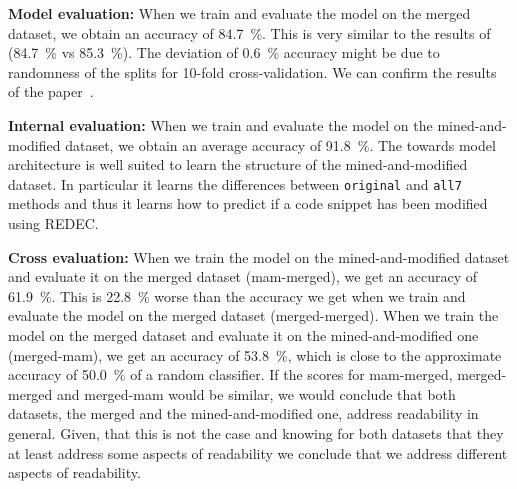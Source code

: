 \documentclass[%
class=scrreprt,
chapterprefix=false,%
open=right,%
twoside=false,%
paper=a4,%
logofile={Logo\_zentral\_farbig\_EN.png},%
thesistype=master,%
UKenglish,%
]{se2thesis}
\theoremstyle{definition}
\newcommand{\rdh}{REDEC\xspace}
\begin{document}
	\textbf{Model evaluation:}
	When we train and evaluate the model on the merged dataset, we obtain an accuracy of 84.7~\%. This is very similar to the results of \citeauthor{mi2022towards} (84.7~\% vs 85.3~\%). The deviation of 0.6~\% accuracy might be due to randomness of the splits for 10-fold cross-validation. We can confirm the results of the paper~\cite{mi2022towards}.
	
	\textbf{Internal evaluation:}
	When we train and evaluate the model on the mined-and-modified dataset, we obtain an average accuracy of 91.8~\%.
	The towards model architecture is well suited to learn the structure of the mined-and-modified dataset. In particular it learns the differences between \texttt{original} and \texttt{all7} methods and thus it learns how to predict if a code snippet has been modified using \rdh. 

	\textbf{Cross evaluation:}
	When we train the model on the mined-and-modified dataset and evaluate it on the merged dataset (mam-merged), we get an accuracy of 61.9~\%. This is 22.8~\% worse than the accuracy we get when we train and evaluate the model on the merged dataset (merged-merged). When we train the model on the merged dataset and evaluate it on the mined-and-modified one (merged-mam), we get an accuracy of 53.8~\%, which is close to the approximate accuracy of 50.0~\% of a random classifier.
	If the scores for mam-merged, merged-merged and merged-mam would be similar, we would conclude that both datasets, the merged and the mined-and-modified one, address readability in general. Given, that this is not the case and knowing for both datasets that they at least address some aspects of readability we conclude that we address different aspects of readability.
	
	
\end{document}

